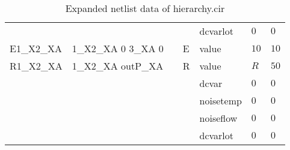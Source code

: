 \begin{table}[H]
\begin{tabular}[c]{lllllll}
\rowcolor{myyellow}
 & & & &\small{dcvarlot} &$0$ &$0$ \\ 
\small{E1\_X2\_XA} &\small{1\_X2\_XA 0 3\_XA 0 } & &\small{E} &\small{value} &$10$ &$10$ \\ 
\rowcolor{myyellow}
\small{R1\_X2\_XA} &\small{1\_X2\_XA outP\_XA } & &\small{R} &\small{value} &$R$ &$50$ \\ 
 & & & &\small{dcvar} &$0$ &$0$ \\ 
\rowcolor{myyellow}
 & & & &\small{noisetemp} &$0$ &$0$ \\ 
 & & & &\small{noiseflow} &$0$ &$0$ \\ 
\rowcolor{myyellow}
 & & & &\small{dcvarlot} &$0$ &$0$ \\ 
\end{tabular}
\caption{Expanded netlist data of hierarchy.cir}
\end{table}

